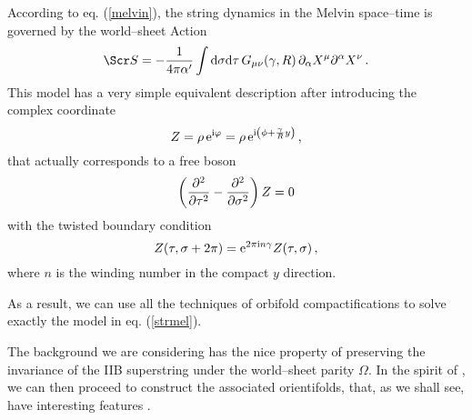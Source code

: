 \documentclass[a4paper,12pt]{article}
\begin{document}
According to eq. (\ref{melvin}), the string dynamics in the Melvin 
space--time is governed by the world--sheet Action
\begin{equation}
{\Scr S} = - {1\over 4\pi \alpha '} \int {\rm d} \sigma {\rm d} \tau
\, G_{\mu \nu} (\gamma , R) \, \partial_\alpha X^\mu \partial^\alpha X^\nu
\,. \label{strmel}
\end{equation}
This model has a very simple equivalent description after introducing
the complex coordinate
\begin{equation} 
Z = \rho \, {\rm e}^{{\rm i} \varphi} =
\rho \, {\rm e}^{{\rm i} \left( \phi + {\gamma \over R} y\right)} \,,
\end{equation}
that actually corresponds to a free boson
\begin{equation}
\left( {\partial^2 \over \partial \tau^2} - {\partial^2 \over \partial
\sigma^2}\right) Z = 0 
\end{equation}
with the twisted boundary condition
\begin{equation}
Z ( \tau , \sigma + 2 \pi ) = {\rm e}^{2\pi {\rm i} n \gamma} Z (\tau ,
\sigma ) \,,
\label{twist}
\end{equation}
where $n$ is the winding number in the compact $y$ direction.

As a result, we can use all the techniques of orbifold compactifications
to solve exactly the model in eq. (\ref{strmel}).

The background we are considering has the nice property of preserving 
the invariance of the IIB superstring under the world--sheet parity
$\Omega$. In the spirit of \cite{cargese}, we can then proceed to 
construct the associated orientifolds, that, as we shall see, have 
interesting features \cite{adm}.
\end{document}
